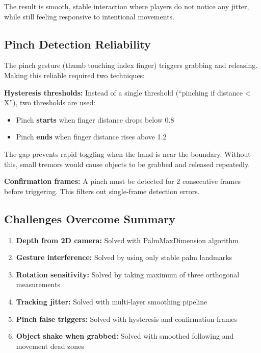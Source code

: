 \documentclass[11pt]{article}
\begin{document}
The result is smooth, stable interaction where players do not notice any jitter, while still feeling responsive to intentional movements.

\subsection{Pinch Detection Reliability}

The pinch gesture (thumb touching index finger) triggers grabbing and releasing. Making this reliable required two techniques:

\textbf{Hysteresis thresholds:} Instead of a single threshold (``pinching if distance < X''), two thresholds are used:
\begin{itemize}
    \item Pinch \textbf{starts} when finger distance drops below 0.8
    \item Pinch \textbf{ends} when finger distance rises above 1.2
\end{itemize}

The gap prevents rapid toggling when the hand is near the boundary. Without this, small tremors would cause objects to be grabbed and released repeatedly.

\textbf{Confirmation frames:} A pinch must be detected for 2 consecutive frames before triggering. This filters out single-frame detection errors.

\subsection{Challenges Overcome Summary}

\begin{enumerate}
    \item \textbf{Depth from 2D camera:} Solved with PalmMaxDimension algorithm
    \item \textbf{Gesture interference:} Solved by using only stable palm landmarks
    \item \textbf{Rotation sensitivity:} Solved by taking maximum of three orthogonal measurements
    \item \textbf{Tracking jitter:} Solved with multi-layer smoothing pipeline
    \item \textbf{Pinch false triggers:} Solved with hysteresis and confirmation frames
    \item \textbf{Object shake when grabbed:} Solved with smoothed following and movement dead zones
\end{enumerate}
\end{document}
